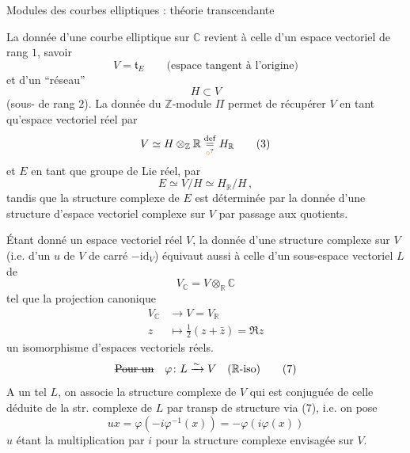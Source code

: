 Modules des courbes elliptiques : théorie transcendante

La donnée d'une courbe elliptique  sur $\mathbb C$ revient à celle  d'un espace vectoriel de rang $1$, savoir 
\[
 V=\mathfrak t_E \qquad \text{(espace tangent à l'origine)} \tag*{(1)}
\]
et d'un ``réseau''
\[
 H\subset V \tag*{(2)}
\]
(sous- de rang $2$). La donnée du  $\mathbb Z$-module $\Pi$ permet de récupérer $V$ en tant qu'espace vectoriel réel  par
\[
 V\simeq H\otimes_{\mathbb Z}\mathbb R\mathrel{\underset{\unsure{\circ}}{\overset{\mathrm{def}}{=}}}H_{\mathbb R} \tag*{(3)}
\]
et $E$ en tant que groupe de Lie réel, par
\[
 E\simeq V/H\simeq H_{\mathbb R}/H\,, \tag*{(4)}
\]
tandis que la structure complexe de $E$ est déterminée par la donnée d'une structure d'espace vectoriel complexe sur $V$ par passage aux quotients.

Étant donné un espace vectoriel réel $V$, la donnée d'une structure complexe sur $V$ (i.e. d'un  $u$ de $V$ de carré $-\mathrm{id}_V$) équivaut aussi à celle d'un sous-espace vectoriel $L$ de 
\[
 V_{\mathbb C}=V\otimes_{\mathbb R}\mathbb C \tag*{(5)}
\]
tel que la projection canonique
\[
 \begin{aligned}
 V_{\mathbb C}&\longrightarrow V=V_{\mathbb R}\\
 z&\longmapsto \tfrac12(z+\bar z)=\Re z
 \end{aligned} \tag*{(6)}
\]
  un isomorphisme d'espaces vectoriels réels.
\[
 \text{\deleted{Pour un}}\quad\varphi\colon L\xrightarrow{\sim}V\quad(\mathbb R\text{-iso}) \tag*{(7)}
\]
A un tel $L$, on associe la structure complexe de   $V$ qui est conjuguée de celle déduite de la str. complexe de $L$ par transp de structure via (7), i.e. on pose
\[
 ux=\varphi(-i\varphi^{-1}(x))=-\varphi(i\varphi(x)) \tag*{(8)}
\]
$u$ étant la multiplication par $i$ pour la structure complexe envisagée sur $V$.


